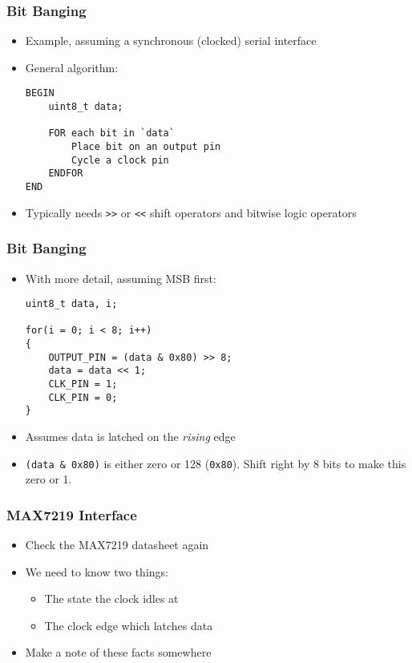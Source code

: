 \documentclass[14pt]{beamer}
\begin{document}
\begin{frame}[fragile]
\frametitle{Bit Banging}
\begin{itemize}
\item Example, assuming a synchronous (clocked) serial interface
\item General algorithm:
\begin{lstlisting}[style=CStyle]
BEGIN
	uint8_t data;

	FOR each bit in `data`
		Place bit on an output pin
		Cycle a clock pin
	ENDFOR
END
\end{lstlisting}
\item Typically needs \texttt{>>} or \texttt{<<} shift operators and bitwise logic operators
\end{itemize}
\end{frame}

\begin{frame}[fragile]
\frametitle{Bit Banging}
\begin{itemize}
\item With more detail, assuming MSB first:
\begin{lstlisting}[style=CStyle]
uint8_t data, i;

for(i = 0; i < 8; i++)
{
	OUTPUT_PIN = (data & 0x80) >> 8;
	data = data << 1;
	CLK_PIN = 1;
	CLK_PIN = 0;
}
\end{lstlisting}
\item Assumes data is latched on the \textit{rising} edge
\item \texttt{(data \& 0x80)} is either zero or 128 (\texttt{0x80}). Shift right by 8 bits to make this zero or 1.
\end{itemize}
\end{frame}

\begin{frame}[fragile]
\frametitle{MAX7219 Interface}
\begin{itemize}
\item Check the MAX7219 datasheet again
\item We need to know two things:
	\begin{itemize}
		\item The state the clock idles at
		\item The clock edge which latches data
	\end{itemize}
\item Make a note of these facts somewhere
\end{itemize}
\end{frame}
\end{document}
